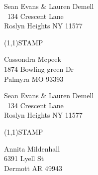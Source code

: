 \documentclass[12pt]{article}
\begin{document}
\clearpage

\begin{minipage}{.5\linewidth} \noindent
Sean Evans \& Lauren Demell\\\ 
134 Crescent Lane\\ 
Roslyn Heights NY 11577
\end{minipage}
\begin{minipage}{.5\linewidth \hspace{-.2in} \vspace{-.3in}}
\begin{flushright}
\framebox(1,1){STAMP}
\end{flushright}
\end{minipage}

\begin{center} \begin{Huge} \vspace*{\fill}
Cassondra Mcpeek\\
1874 Bowling green Dr\\
Palmyra MO 93393\\
\vspace{\fill} \end{Huge} \end{center}

\clearpage

\begin{minipage}{.5\linewidth} \noindent
Sean Evans \& Lauren Demell\\\ 
134 Crescent Lane\\ 
Roslyn Heights NY 11577
\end{minipage}
\begin{minipage}{.5\linewidth \hspace{-.2in} \vspace{-.3in}}
\begin{flushright}
\framebox(1,1){STAMP}
\end{flushright}
\end{minipage}

\begin{center} \begin{Huge} \vspace*{\fill}
Annita Mildenhall\\
6391 Lyell St\\
Dermott AR 49943\\
\vspace{\fill} \end{Huge} \end{center}
\end{document}
